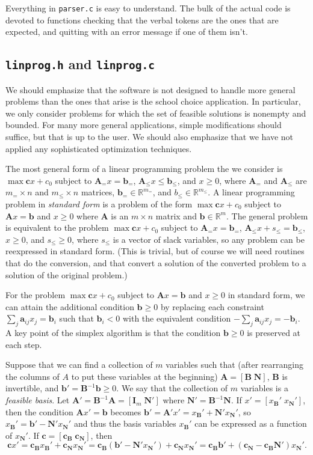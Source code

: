 \documentclass[12pt]{article}
\theoremstyle{definition}
\renewcommand{\Re}{\mathbb{R}}
\newcommand{\ba}{\mathbf{a}}
\newcommand{\bb}{\mathbf{b}}
\newcommand{\bc}{\mathbf{c}}
\newcommand{\bA}{\mathbf{A}}
\newcommand{\bB}{\mathbf{B}}
\newcommand{\bI}{\mathbf{I}}
\newcommand{\bN}{\mathbf{N}}
\begin{document}
\begin{appendix}
Everything in \texttt{parser.c} is easy to understand.  The bulk of
the actual code is devoted to functions checking that the verbal
tokens are the ones that are expected, and quitting with an error
message if one of them isn't.

\subsection{\texttt{linprog.h} and \texttt{linprog.c}}

We should emphasize that the software is not designed to handle more
general problems than the ones that arise is the school choice
application.  In particular, we only consider problems for which the
set of feasible solutions is nonempty and bounded.  For many more
general applications, simple modifications should suffice, but that is
up to the user.  We should also emphasize that we have not applied any
sophisticated optimization techniques.

The most general form of a linear programming problem the we consider
is $\max \bc x + c_0$ subject to $\bA_= x = \bb_=$, $\bA_\le x \le
\bb_\le$, and $x \ge 0$, where $\bA_=$ and $\bA_\le$ are $m_= \times
n$ and $m_\le \times n$ matrices, $\bb_= \in \Re^{m_=}$, and $b_\le
\in \Re^{m_\le}$.  A linear programming problem in \emph{standard
form} is a problem of the form $\max \bc x + c_0$ subject to $\bA x =
\bb$ and $x \ge 0$ where $\bA$ is an $m \times n$ matrix and $\bb \in
\Re^m$.  The general problem is equivalent to the problem $\max \bc x
+ c_0$ subject to $\bA_= x = \bb_=$, $\bA_\le x + s_\le = \bb_\le$, $x
\ge 0$, and $s_\le \ge 0$, where $s_\le$ is a vector of slack
variables, so any problem can be reexpressed in standard form.  (This
is trivial, but of course we will need routines that do the
conversion, and that convert a solution of the converted problem to a
solution of the original problem.)

For the problem $\max \bc x + c_0$ subject to $\bA x = \bb$ and $x \ge
0$ in standard form, we can attain the additional condition $\bb \ge
0$ by replacing each constraint $\sum_j \ba_{ij} x_j = \bb_i$ such
that $\bb_i < 0$ with the equivalent condition $-\sum_j \ba_{ij} x_j =
-\bb_i$.  A key point of the simplex algorithm is that the condition
$\bb \ge 0$ is preserved at each step.

Suppose that we can find a collection of $m$ variables such that
(after rearranging the columns of $A$ to put these variables at the
beginning) $\bA = [\bB \; \bN]$, $\bB$ is invertible, and $\bb' =
\bB^{-1} \bb \ge 0$.  We say that the collection of $m$ variables is a
\emph{feasible basis}.  Let $\bA' = \bB^{-1}\bA = [\bI_m \; \bN']$ where
$\bN' = \bB^{-1}\bN$.  If $x' = [x_\bB' \; x_\bN']$, then the
condition $\bA x' = \bb$ becomes $\bb' = \bA' x' = x_\bB' + \bN'
x_\bN'$, so $x_\bB' = \bb' - \bN' x_\bN'$ and thus the basis variables
$x_\bB'$ can be expressed as a function of $x_\bN'$.  If $\bc =
[\bc_\bB \; \bc_\bN]$, then $$\bc x' = \bc_\bB x_\bB' + \bc_\bN x_\bN'
= \bc_\bB (\bb' - \bN' x_\bN') + \bc_\bN x_\bN' = \bc_\bB \bb' +
(\bc_\bN - \bc_\bB \bN')x_\bN'.$$


\end{appendix}
\end{document}
